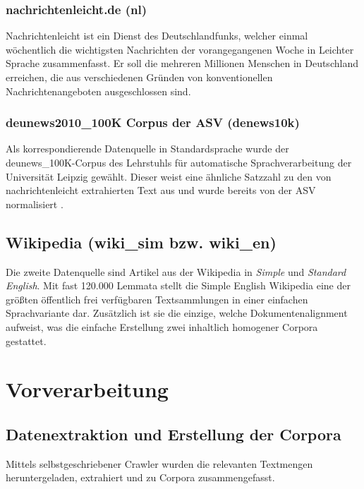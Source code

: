 \documentclass[11pt, a4paper]{article}
\begin{document}
\subsubsection{nachrichtenleicht.de (nl)}

Nachrichtenleicht ist ein Dienst des Deutschlandfunks, welcher einmal
w\"ochentlich die wichtigsten Nachrichten der vorangegangenen Woche in Leichter
Sprache zusammenfasst. Er soll die mehreren Millionen Menschen in Deutschland
erreichen, die aus verschiedenen Gr\"unden von konventionellen
Nachrichtenangeboten ausgeschlossen sind.

\subsubsection{deunews2010\_100K Corpus der ASV (denews10k)}

Als korrespondierende Datenquelle in Standardsprache wurde der
deunews\_100K-Corpus des Lehrstuhls f\"ur automatische Sprachverarbeitung
der Universit\"at Leipzig gew\"ahlt. Dieser weist eine \"ahnliche Satzzahl zu
den von nachrichtenleicht extrahierten Text aus und wurde bereits von der ASV
normalisiert \cite{Quasthoff2006}.

\subsection{Wikipedia (wiki\_sim bzw. wiki\_en)}

Die zweite Datenquelle sind Artikel aus der Wikipedia in \emph{Simple} und
\emph{Standard English}. Mit fast 120.000 Lemmata stellt die Simple English
Wikipedia eine der gr\"o\ss{}ten \"offentlich frei verf\"ugbaren Textsammlungen
in einer einfachen Sprachvariante dar. Zus\"atzlich ist sie die
einzige, welche Dokumentenalignment aufweist, was die einfache Erstellung zwei
inhaltlich homogener Corpora gestattet.


\section{Vorverarbeitung}

\subsection{Datenextraktion und Erstellung der Corpora}
\label{datextr}

Mittels selbstgeschriebener Crawler wurden die relevanten Textmengen
heruntergeladen, extrahiert und zu Corpora zusammengefasst.
\end{document}
